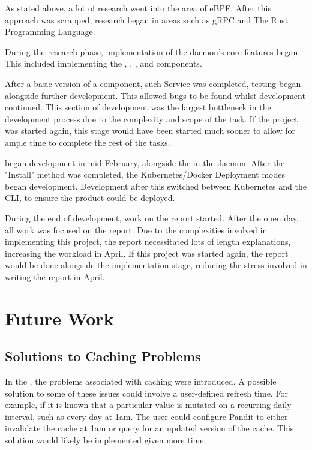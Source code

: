 \documentclass[a4paper,12pt]{report}
\begin{document}
As stated above, a lot of research went into the area of eBPF. After this approach was scrapped, research began in areas such as gRPC and The Rust Programming Language.

During the research phase, implementation of the daemon's core features began. This included implementing the , , ,  and  components.

After a basic version of a component, such Service was completed, testing began alongside further development. This allowed bugs to be found whilst development continued.
This section of development was the largest bottleneck in the development process due to the complexity and scope of the task.
If the project was started again, this stage would have been started much sooner to allow for ample time to complete the rest of the tasks.

 began development in mid-February, alongside the  in the daemon. After the "Install" method was completed,
the Kubernetes/Docker Deployment modes began development. Development after this switched between Kubernetes and the CLI, to ensure the product could be deployed.

During the end of development, work on the report started. After the open day, all work was focused on the report.
Due to the complexities involved in implementing this project, the report necessitated lots of length explanations, increasing the workload in April.
If this project was started again, the report would be done alongside the implementation stage, reducing the stress involved in writing the report in April.

\section{Future Work}
\label{sec:future}
\subsection{Solutions to Caching Problems}
In the , the problems associated with caching were introduced.
A possible solution to some of these issues could involve a user-defined refresh time. For example, if it is known that a particular value is mutated on a recurring daily interval, such as every day at 1am. The user could configure Pandit to either invalidate the cache at 1am or query for an updated version of the cache.
This solution would likely be implemented given more time.
\end{document}
